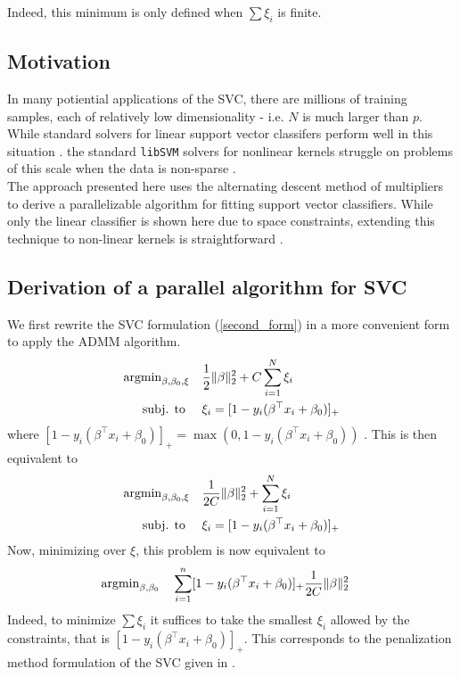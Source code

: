 \documentclass[11pt]{article}
\begin{document}
Indeed, this minimum is only defined when $\sum \xi_i$ is finite. 


\subsection{Motivation}

In many potiential applications of the SVC, there are millions of training samples, each of
relatively low dimensionality - i.e. $N$ is much larger than $p$.
While standard solvers for linear support vector classifers perform well in this situation 
\cite{fan2008liblinear}.
the standard \texttt{libSVM} solvers for nonlinear kernels struggle on problems of this 
scale when the data is non-sparse \cite{chang2011libsvm}. \\

The approach presented here uses the alternating descent method of multipliers to derive 
a parallelizable algorithm for fitting support vector classifiers. While only the linear classifier is shown here 
due to space constraints, extending this technique to non-linear kernels is straightforward \cite{forero2010consensus}.


\subsection{Derivation of a parallel algorithm for SVC}

We first rewrite the SVC formulation (\ref{second_form}) in a more convenient form to apply the ADMM algorithm.
\begin{equation*} 
\begin{aligned}
    \operatorname{argmin}_{\beta, \beta_0, \xi} \quad &   \frac{1}{2} \|\beta\|_2^2 + C\sum_{i=1}^N \xi_i\\
    \textrm{subj. to } \quad & \xi_i =  [1 - y_i (\beta^\top x_i + \beta_0)]_+
\end{aligned}
\end{equation*}
where  $[1 - y_i (\beta^\top x_i + \beta_0)]_+ = \max(0, 1 - y_i (\beta^\top x_i + \beta_0))$ . This is then equivalent to
\begin{equation*} 
\begin{aligned}
        \operatorname{argmin}_{\beta, \beta_0, \xi} \quad & \frac{1}{2C} \|\beta\|_2^2 + \sum_{i=1}^N \xi_i\\
        \textrm{subj. to } \quad & \xi_i =  [1 - y_i (\beta^\top x_i + \beta_0)]_+
\end{aligned}
\end{equation*}
Now, minimizing over $\xi$, this problem is now equivalent to
\begin{equation} \label{third_formulation}
\begin{aligned}
        \operatorname{argmin}_{\beta, \beta_0} \quad 
        &  \sum_{i=1}^n [1 - y_i (\beta^\top x_i + \beta_0)]_+ \frac{1}{2C} \|\beta\|_2^2 
\end{aligned}
\end{equation}
Indeed, to minimize $\sum \xi_i$ it suffices to take the smallest $\xi_i$ allowed by the constraints,
that is $[1 - y_i (\beta^\top x_i + \beta_0)]_+$. This corresponds to the penalization method
formulation of the SVC given in \cite{hastie2009elements}. \\
\end{document}
